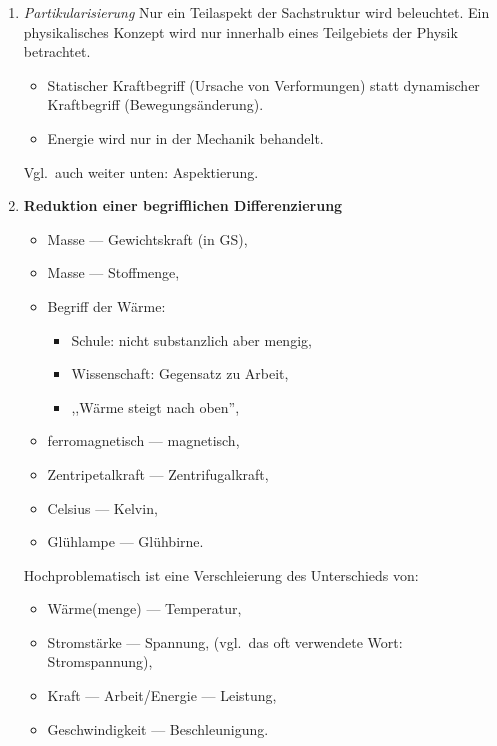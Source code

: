 \begin{enumerate}
	\item { \it Partikularisierung }
	Nur ein Teilaspekt der Sachstruktur wird beleuchtet.
	Ein physikalisches Konzept wird nur innerhalb eines Teilgebiets der
	Physik betrachtet.
	
	\mip
	\begin{beisp}
	\begin{itemize}
		\item Statischer Kraftbegriff (Ursache von Verformungen) statt dynamischer
	Kraftbegriff (Bewegungs\"{a}nderung).
		\item Energie wird nur in der Mechanik behandelt.
	\end{itemize}	
	\end{beisp}

	
	Vgl.\ auch weiter unten: Aspektierung.
	
	\item \textbf{Reduktion einer begrifflichen Differenzierung}
	
	\mip
	\begin{beisp}
	\begin{itemize}
		\item Masse --- Gewichtskraft (in GS),
		\item Masse --- Stoffmenge,
		\item Begriff der W\"{a}rme:
		\begin{itemize}
			\item Schule: nicht substanzlich aber mengig,
			\item Wissenschaft: Gegensatz zu Arbeit,
			\item ,,W\"{a}rme steigt nach oben'',
		\end{itemize}
		\item ferromagnetisch --- magnetisch,
		\item Zentripetalkraft --- Zentrifugalkraft,
		\item Celsius --- Kelvin,
		\item Gl\"{u}hlampe --- Gl\"{u}hbirne.
	\end{itemize}
	\end{beisp}
	
	Hochproblematisch ist eine Verschleierung des Unterschieds von:
	\begin{itemize}
		\item W\"{a}rme(menge) --- Temperatur,
		\item Stromst\"{a}rke --- Spannung,
		(vgl.\ das oft verwendete Wort: Stromspannung),
		\item Kraft --- Arbeit/Energie --- Leistung,
		\item Geschwindigkeit --- Beschleunigung.
	\end{itemize}
	

\end{enumerate}
